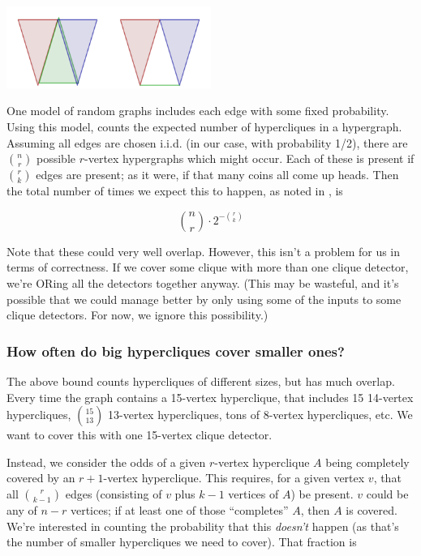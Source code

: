 \documentclass[12pt]{article}
\theoremstyle{definition}
\begin{document}
\includegraphics[width=0.5\textwidth]{R/maximal.pdf}

One model of random graphs
includes each edge with some fixed probability. Using this model,
\cite{bollobas1976cliques}
counts the expected number of hypercliques in a hypergraph. Assuming all
edges are chosen i.i.d. (in our case, with probability 1/2),
there are ${n \choose r}$ possible $r$-vertex hypergraphs which might
occur. Each of these is present if ${r \choose k}$ edges are present; as it
were, if that many coins all come up heads. Then the total number of times
we expect this to happen, as noted in \cite{bollobas1976cliques}, is

\[
{n \choose r} \cdot 2^{-{r \choose k}}
\]

Note that these could very well overlap. However, this isn't a problem for
us in terms of correctness. If we cover some clique
with more than one
clique detector, we're
ORing all the detectors together anyway. (This may be wasteful, and it's
possible that we could manage better by only using some of the inputs to
some clique detectors. For now, we ignore this possibility.)

\subsubsection{How often do big hypercliques cover smaller ones?}

The above bound counts hypercliques of different sizes, but has much overlap.
Every time the graph contains a 15-vertex hyperclique, that includes
15 14-vertex hypercliques, ${15 \choose 13}$ 13-vertex hypercliques,
tons of 8-vertex hypercliques, etc. We want to
cover this with one 15-vertex clique detector.

Instead, we consider the odds of a given $r$-vertex hyperclique $A$
being completely
covered by an $r+1$-vertex hyperclique. This requires, for a given vertex
$v$, that all ${r \choose {k-1}}$ edges (consisting of $v$ plus $k-1$ vertices
of $A$) be present. $v$ could be any of $n - r$ vertices; if at least one
 of those
``completes'' $A$, then $A$ is covered. We're interested in counting the
probability that this {\em doesn't} happen (as that's the number of smaller
hypercliques we need to cover). That fraction is
\end{document}
